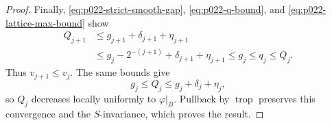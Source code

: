 \begin{proof}
Finally, \eqref{eq:p022-strict-smooth-gap},
\eqref{eq:p022-q-bound}, and \eqref{eq:p022-lattice-max-bound} show
\[
\begin{aligned}
 Q_{j+1}
 &\leq g_{j+1}+\delta_{j+1}+\eta_{j+1}\\
 &\leq g_j-2^{-(j+1)}+\delta_{j+1}+\eta_{j+1}
 \leq g_j\leq q_j\leq Q_j.
\end{aligned}
\]
Thus \(v_{j+1}\leq v_j\).  The same bounds give
\[
                 g_j\leq Q_j\leq g_j+\delta_j+\eta_j,
\]
so \(Q_j\) decreases locally uniformly to \(\varphi|_B\).  Pullback by
\(\operatorname{trop}\) preserves this convergence and the
\(S\)-invariance, which proves the result.
\end{proof}
